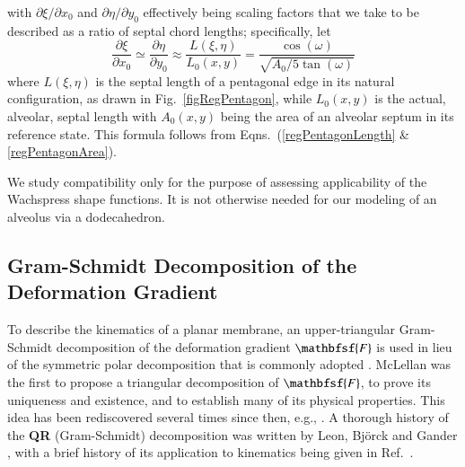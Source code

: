 with $\partial \xi / \partial x_0$ and $\partial \eta / \partial y_0$ effectively being scaling factors that we take to be described as a ratio of septal chord lengths; specifically, let
\begin{equation}
\frac{\partial \xi}{\partial x_0} \simeq
\frac{\partial \eta}{\partial y_0} \approx 
\frac{L(\xi, \eta)}{L_0 (x, y)} = 
\frac{\cos (\omega)}{\sqrt{A_0 / 5 \tan (\omega)}}
\end{equation}
where $L(\xi,\eta)$ is the septal length of a pentagonal edge in its natural configuration, as drawn in Fig.~\ref{figRegPentagon}, while $L_0(x,y)$ is the actual, alveolar, septal length with $A_0(x,y)$ being the area of an alveolar septum in its reference state.  This formula follows from Eqns.~(\ref{regPentagonLength} \& \ref{regPentagonArea}).

We study compatibility only for the purpose of assessing applicability of the Wachspress shape functions.  It is not otherwise needed for our modeling of an alveolus via a dodecahedron. 

\subsection{Gram-Schmidt Decomposition of the Deformation Gradient}
\label{secQR}

To describe the kinematics of a planar membrane, an upper-triangular Gram-Schmidt decomposition of the deformation gradient $\mathbfsf{F}$ is used in lieu of the symmetric polar decomposition that is commonly adopted \cite{Srinivasa12,FreedSrinivasa15,Freedetal17,FreedZamani19,Freedetal19}.  McLellan \cite{McLellan76,McLellan80} was the first to propose a triangular decomposition of $\mathbfsf{F}$, to prove its uniqueness and existence, and to establish many of its physical properties.  This idea has been rediscovered several times since then, e.g., \cite{Rosakis90,Souchet93,Srinivasa12}.  A thorough history of the \textbf{QR} (Gram-Schmidt) decomposition was written by Leon, Bj\"orck and Gander \cite{Leonetal13}, with a brief history of its application to kinematics being given in Ref.~\cite{Freedetal19}.

